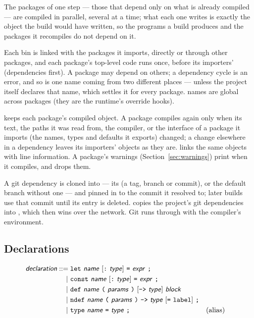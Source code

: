 The packages of one step --- those that depend only on what is already
compiled --- are compiled in parallel, several at a time; what each one
writes is exactly the object the build would have written, so the
programs a build produces and the packages it recompiles do not depend
on it.

Each bin is linked with the packages it imports, directly or through
other packages, and each package's top-level code runs once, before its
importers' (dependencies first). A package may depend on others; a
dependency cycle is an error, and so is one name coming from two
different places --- unless the project itself declares that name,
which settles it for every package.  names are global across
packages (they are the runtime's override hooks).

 keeps each package's compiled object. A package compiles
again only when its text, the paths it was read from, the compiler, or
the interface of a package it imports (the names, types and defaults it
exports) changed; a change elsewhere in a dependency leaves its
importers' objects as they are.  links the same
objects with line information. A package's warnings
(Section~\ref{sec:warnings}) print when it compiles, and  drops
them.

A git dependency is cloned into  --- its  (a tag,
branch or commit), or the default branch without one --- and pinned in
 to the commit it resolved to; later builds use that commit
until its  entry is deleted.  copies the
project's git dependencies into , which then wins over the
network. Git runs through  with the compiler's environment.

\subsection{Declarations}
\label{sec:declarations}

\begin{align*}
\ty{declaration} ::={}& \ic{let}~\ty{name}~[\ic{:}~\ty{type}]~\ic{=}~\ty{expr}~\ic{;} \\
  |~& \ic{const}~\ty{name}~[\ic{:}~\ty{type}]~\ic{=}~\ty{expr}~\ic{;} \\
  |~& \ic{def}~\ty{name}~\ic{(}~\ty{params}~\ic{)}~[\ic{->}~\ty{type}]~\ty{block} \\
  |~& \ic{ndef}~\ty{name}~\ic{(}~\ty{params}~\ic{)}~\ic{->}~\ty{type}~[\ic{=}~\ic{label}]~\ic{;} \\
  |~& \ic{type}~\ty{name}~\ic{=}~\ty{type}~\ic{;}                && \text{(alias)}
\end{align*}


